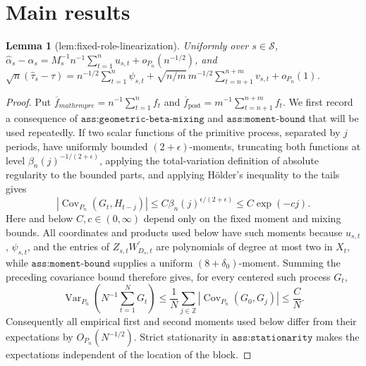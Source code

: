 \documentclass{article}
\newtheorem{lemma}{Lemma}
\begin{document}
\section{Main results}

\begin{lemma}[lem:fixed-role-linearization]\label{lem:fixed-role-linearization}
Uniformly over \(s\in\mathcal S\), \(\widehat\alpha_s-\alpha_s=M_s^{-1}n^{-1}\sum_{t=1}^n u_{s,t}+o_{P_n}(n^{-1/2})\), and \(\sqrt n(\widehat\tau_s-\tau)=n^{-1/2}\sum_{t=1}^n\psi_{s,t}+\sqrt{n/m}\,m^{-1/2}\sum_{t=n+1}^{n+m}v_{s,t}+o_{P_n}(1)\).
\end{lemma}
\begin{proof}
Put \(\overline f_{mathrm{pre}}=n^{-1}\sum_{t=1}^n f_t\) and \(\overline f_{\mathrm{post}}=m^{-1}\sum_{t=n+1}^{n+m}f_t\).  We first record a consequence of \(\texttt{ass:geometric-beta-mixing}\) and \(\texttt{ass:moment-bound}\) that will be used repeatedly.  If two scalar functions of the primitive process, separated by \(j\) periods, have uniformly bounded \((2+\epsilon)\)-moments, truncating both functions at level \(\beta_n(j)^{-1/(2+\epsilon)}\), applying the total-variation definition of absolute regularity to the bounded parts, and applying H\"older's inequality to the tails gives
\[
 \left|\operatorname{Cov}_{P_n}(G_t,H_{t-j})\right|
 \leq C\beta_n(j)^{\epsilon/(2+\epsilon)}
 \leq C\exp(-c j).
\]
Here and below \(C,c\in(0,\infty)\) depend only on the fixed moment and mixing bounds.  All coordinates and products used below have such moments because \(u_{s,t}\), \(\psi_{s,t}\), and the entries of \(Z_{s,t}W_{D_s,t}^{\prime}\) are polynomials of degree at most two in \(X_t\), while \(\texttt{ass:moment-bound}\) supplies a uniform \((8+\delta_0)\)-moment.  Summing the preceding covariance bound therefore gives, for every centered such process \(G_t\),
\[
 \operatorname{Var}_{P_n}\!\left(N^{-1}\sum_{t=1}^N G_t\right)
 \leq \frac{1}{N}\sum_{j\in\mathbb Z}
       \left|\operatorname{Cov}_{P_n}(G_0,G_j)\right|
 \leq \frac{C}{N}.
\]
Consequently all empirical first and second moments used below differ from their expectations by \(O_{P_n}(N^{-1/2})\).  Strict stationarity in \(\texttt{ass:stationarity}\) makes the expectations independent of the location of the block.


\end{proof}
\end{document}
